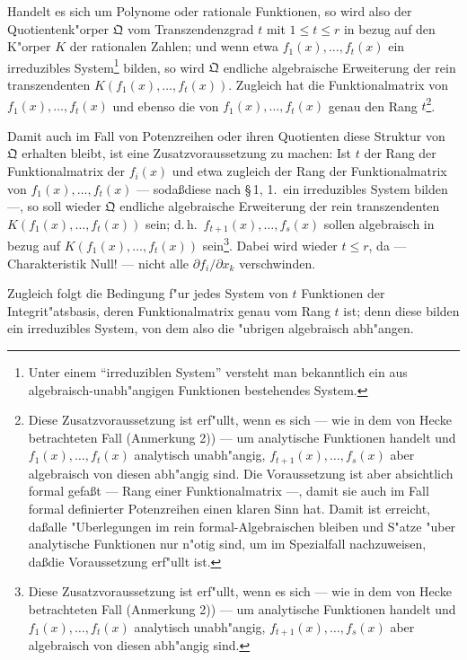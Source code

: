 Handelt es sich um Polynome oder rationale Funktionen, so wird also der Quotientenk"orper $\mathfrak{Q}$ vom Transzendenzgrad $t$ mit $1 \leq t \leq r$ in bezug auf den K"orper $K$ der rationalen Zahlen; und wenn etwa $f_1(x),\ldots,f_t(x)$ ein irreduzibles System\footnote{Unter einem ``irreduziblen System'' versteht man bekanntlich ein aus algebraisch-unabh"angigen Funktionen bestehendes System.} bilden, so wird $\mathfrak{Q}$ endliche algebraische Erweiterung der rein transzendenten $K(f_1(x),\ldots,f_t(x))$. Zugleich hat die Funktionalmatrix von $f_1(x),\ldots,f_t(x)$ und ebenso die von $f_1(x),\ldots,f_t(x)$ genau den Rang $t$\footnote{Diese Zusatzvoraussetzung ist erf"ullt, wenn es sich --- wie in dem von Hecke betrachteten Fall (Anmerkung 2)) --- um analytische Funktionen handelt und $f_1(x),\ldots,f_t(x)$ analytisch unabh"angig, $f_{t+1}(x),\ldots,f_s(x)$ aber algebraisch von diesen abh"angig sind. Die Voraussetzung ist aber absichtlich formal gefa\ss t --- Rang einer Funktionalmatrix ---, damit sie auch im Fall formal definierter Potenzreihen einen klaren Sinn hat. Damit ist erreicht, da\ss alle "Uberlegungen im rein formal-Algebraischen bleiben und S"atze "uber analytische Funktionen nur n"otig sind, um im Spezialfall nachzuweisen, da\ss die Voraussetzung erf"ullt ist.}.

Damit auch im Fall von Potenzreihen oder ihren Quotienten diese Struktur von $\mathfrak{Q}$ erhalten bleibt, ist eine Zusatzvoraussetzung zu machen: Ist $t$ der Rang der Funktionalmatrix der $f_i(x)$ und etwa zugleich der Rang der Funktionalmatrix von $f_1(x),\ldots,f_t(x)$ --- soda\ss diese nach \S\,1, 1.\ ein irreduzibles System bilden ---, so soll wieder $\mathfrak{Q}$ endliche algebraische Erweiterung der rein transzendenten $K(f_1(x),\ldots,f_t(x))$ sein; d.\,h.\ $f_{t+1}(x),\ldots,f_s(x)$ sollen algebraisch in bezug auf $K(f_1(x),\ldots,f_t(x))$ sein\footnote{Diese Zusatzvoraussetzung ist erf"ullt, wenn es sich --- wie in dem von Hecke betrachteten Fall (Anmerkung 2)) --- um analytische Funktionen handelt und $f_1(x),\ldots,f_t(x)$ analytisch unabh"angig, $f_{t+1}(x),\ldots,f_s(x)$ aber algebraisch von diesen abh"angig sind.}. Dabei wird wieder $t \leq r$, da --- Charakteristik Null! --- nicht alle $\partial f_i/\partial x_k$ verschwinden.

Zugleich folgt die Bedingung f"ur jedes System von $t$ Funktionen der Integrit"atsbasis, deren Funktionalmatrix genau vom Rang $t$ ist; denn diese bilden ein irreduzibles System, von dem also die "ubrigen algebraisch abh"angen.

